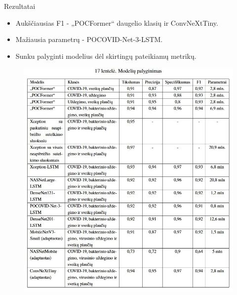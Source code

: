 \documentclass{VUMIFSlides}
\begin{document}
\begin{frame}[c]{Rezultatai}
    \begin{minipage}[c]{0.45\textwidth}
        \begin{itemize}
            \item Aukščiausias F1 - „POCFormer“ daugelio klasių ir ConvNeXtTiny.
            \item Mažiausia parametrų - POCOVID-Net-3-LSTM.
            \item Sunku palyginti modelius dėl skirtingų pateikiamų metrikų.
        \end{itemize}
    \end{minipage}
    \hfill
    \begin{minipage}[c]{0.45\textwidth}
        \begin{figure}[H]
            \centering
            \includegraphics[scale=0.33]{img/Capture.JPG}
            \label{img:POCFormer}
        \end{figure}
    \end{minipage}
\end{frame}
\end{document}
